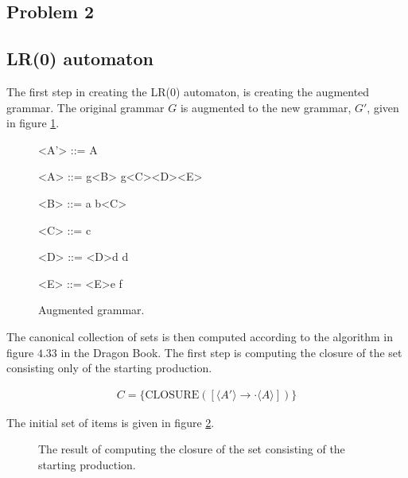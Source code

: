 \documentclass[twoside]{article}
\begin{document}
\begin{multicols}{2}
    \section{Problem 2}
    \subsection{LR(0) automaton}

    The first step in creating the LR(0) automaton, is creating the augmented grammar. 
    The original grammar $G$ is augmented to the new grammar, $G'$, given in figure \ref{fig:prob2aaugmentedgrammar}.

    \begin{figure}[H]
        \begin{grammar}
            <A'>    ::= A

            <A>     ::= g<B>
            \alt g<C><D><E>

            <B>     ::= a
            \alt b<C>

            <C>     ::= c

            <D>     ::= <D>d
            \alt d

            <E>     ::= <E>e
            \alt f
        \end{grammar}
        \caption{Augmented grammar.} \label{fig:prob2aaugmentedgrammar}
    \end{figure}

    The canonical collection of sets is then computed according to the algorithm in figure $4.33$ in the Dragon Book.
    The first step is computing the closure of the set consisting only of the starting production.

    \begin{gather*}
        C = \{\textrm{CLOSURE}([\langle A' \rangle \rightarrow \cdot \langle A \rangle])\}
    \end{gather*}

    The initial set of items is given in figure \ref{fig:prob2ainitialclosure}.

    \begin{figure}[H]
        \centering
        \caption{The result of computing the closure of the set consisting of the starting production.} \label{fig:prob2ainitialclosure}
    \end{figure}


\end{multicols}
\end{document}
